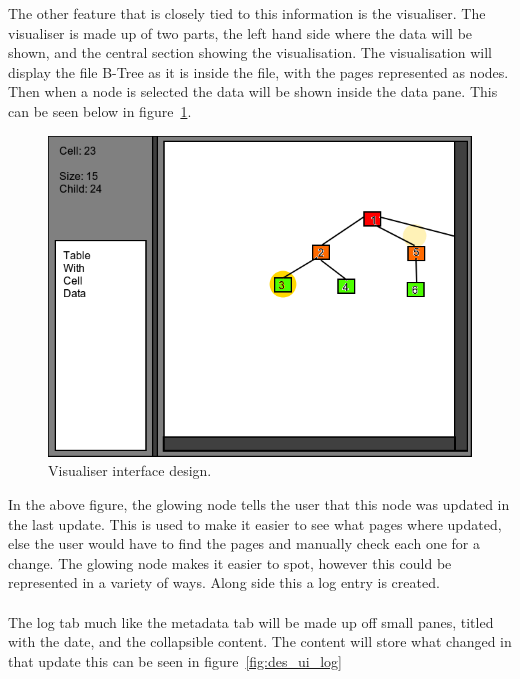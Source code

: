 The other feature that is closely tied to this information is the visualiser. The visualiser is made up of two parts, the left hand side where the data will be shown, and the central section showing the visualisation. The visualisation will display the file B-Tree as it is inside the file, with the pages represented as nodes. Then when a node is selected the data will be shown inside the data pane. This can be seen below in figure~\ref{fig:des_ui_vis}.

\begin{figure}[H]
	\centering
	\includegraphics[scale=0.32]{images/ui_visuliser.png}
	\caption{Visualiser interface design.}
	\label{fig:des_ui_vis}
\end{figure}

In the above figure, the glowing node tells the user that this node was updated in the last update. This is used to make it easier to see what pages where updated, else the user would have to find the pages and manually check each one for a change. The glowing node makes it easier to spot, however this could be represented in a variety of ways. Along side this a log entry is created. 
\\\\
The log tab much like the metadata tab will be made up off small panes, titled with the date, and the collapsible content. The content will store what changed in that update this can be seen in figure~\ref{fig:des_ui_log}

